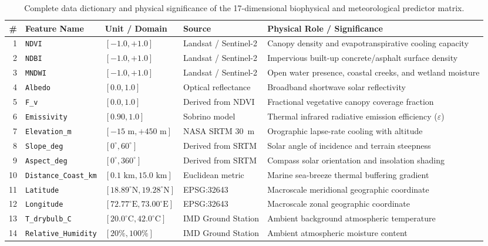 \documentclass[a4paper,fleqn]{cas-sc}
\begin{document}
\begin{table}
\caption{Complete data dictionary and physical significance of the 17-dimensional biophysical and meteorological predictor matrix.}
\label{tab:features}
\footnotesize
\begin{tabularx}{\columnwidth}{@{}r l l l X@{}}
\toprule
\# & Feature Name & Unit / Domain & Source & Physical Role / Significance \\
\midrule
1 & \texttt{NDVI} & $[-1.0, +1.0]$ & Landsat / Sentinel-2 & Canopy density and evapotranspirative cooling capacity \\
2 & \texttt{NDBI} & $[-1.0, +1.0]$ & Landsat / Sentinel-2 & Impervious built-up concrete/asphalt surface density \\
3 & \texttt{MNDWI} & $[-1.0, +1.0]$ & Landsat / Sentinel-2 & Open water presence, coastal creeks, and wetland moisture \\
4 & \texttt{Albedo} & $[0.0, 1.0]$ & Optical reflectance & Broadband shortwave solar reflectivity \\
5 & \texttt{F\_v} & $[0.0, 1.0]$ & Derived from NDVI & Fractional vegetative canopy coverage fraction \\
6 & \texttt{Emissivity} & $[0.90, 1.0]$ & Sobrino model & Thermal infrared radiative emission efficiency ($\varepsilon$) \\
7 & \texttt{Elevation\_m} & $[-15\text{ m}, +450\text{ m}]$ & NASA SRTM 30~m & Orographic lapse-rate cooling with altitude \\
8 & \texttt{Slope\_deg} & $[0^\circ, 60^\circ]$ & Derived from SRTM & Solar angle of incidence and terrain steepness \\
9 & \texttt{Aspect\_deg} & $[0^\circ, 360^\circ]$ & Derived from SRTM & Compass solar orientation and insolation shading \\
10 & \texttt{Distance\_Coast\_km} & $[0.1\text{ km}, 15.0\text{ km}]$ & Euclidean metric & Marine sea-breeze thermal buffering gradient \\
11 & \texttt{Latitude} & $[18.89^\circ\text{N}, 19.28^\circ\text{N}]$ & EPSG:32643 & Macroscale meridional geographic coordinate \\
12 & \texttt{Longitude} & $[72.77^\circ\text{E}, 73.00^\circ\text{E}]$ & EPSG:32643 & Macroscale zonal geographic coordinate \\
13 & \texttt{T\_drybulb\_C} & $[20.0^\circ\text{C}, 42.0^\circ\text{C}]$ & IMD Ground Station & Ambient background atmospheric temperature \\
14 & \texttt{Relative\_Humidity} & $[20\%, 100\%]$ & IMD Ground Station & Ambient atmospheric moisture content \\

\end{tabularx}
\end{table}
\end{document}
